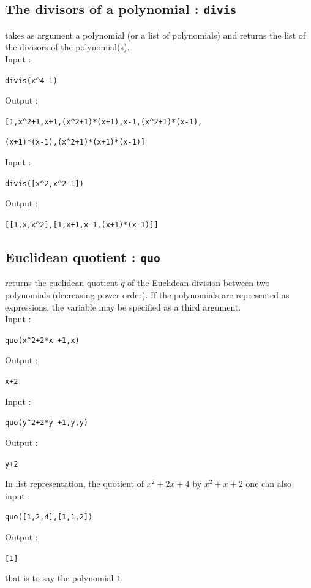 \documentclass[a4paper,11pt]{book}
\begin{document}
\subsection{The divisors of a polynomial : {\tt divis}}
 takes as argument a polynomial (or a list of 
polynomials) and returns the list
 of the divisors of the polynomial(s).\\ 
Input : 
\begin{center}{\tt divis(x\verb|^|4-1)}\end{center}
Output :
\begin{center}{\tt [1,x\verb|^|2+1,x+1,(x\verb|^|2+1)*(x+1),x-1,(x\verb|^|2+1)*(x-1),}\end{center}
\begin{center}{\tt (x+1)*(x-1),(x\verb|^|2+1)*(x+1)*(x-1)]}\end{center}
Input : 
\begin{center}{\tt divis([x\verb|^|2,x\verb|^|2-1])}\end{center}
Output :
\begin{center}{\tt [[1,x,x\verb|^|2],[1,x+1,x-1,(x+1)*(x-1)]]}\end{center}

\subsection{Euclidean quotient : {\tt quo}}
 returns the euclidean quotient  $q$ of the
Euclidean division between two polynomials (decreasing power order).
If the polynomials are represented as 
expressions, the variable may be specified as a third
argument.\\
Input :
\begin{center}{\tt quo(x\verb|^|2+2*x +1,x)}\end{center}
Output :
\begin{center}{\tt x+2}\end{center}
Input :
\begin{center}{\tt quo(y\verb|^|2+2*y +1,y,y)}\end{center}
Output :
\begin{center}{\tt y+2}\end{center}
In list representation, the quotient of $x^2+2x+4$ by $x^2+x+2$ 
one can also input :
\begin{center}{\tt quo([1,2,4],[1,1,2])}\end{center}
Output :
\begin{center}{\tt [1]}\end{center}
that is to say  the polynomial {\tt 1}.
\end{document}
